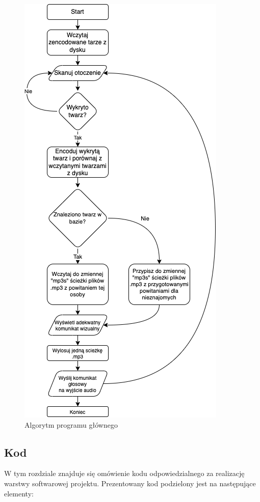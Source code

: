 \documentclass[a4paper,12pt,reqno]{article}
\begin{document}
\begin{figure}[H]%
\centering
\includegraphics[width=0.7\columnwidth]{imgs/glowny.drawio.png}
\caption{Algorytm programu głównego \cite{img_by_me} \label{algorytm_start_recognition}}
\quad
\end{figure}

\subsection{Kod}
W tym rozdziale znajduje się omówienie kodu odpowiedzialnego za realizację warstwy softwarowej projektu.
Prezentowany kod podzielony jest na następujące elementy:
\end{document}
